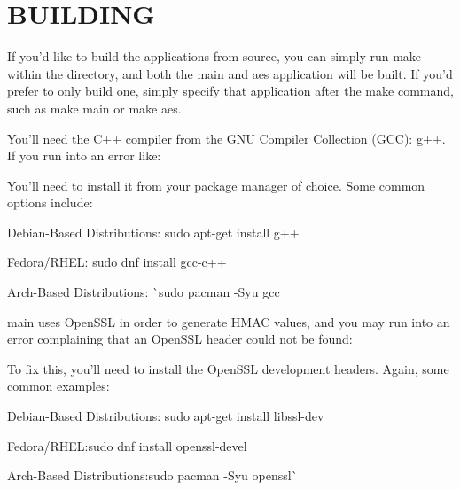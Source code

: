 \chapter{BUILDING}
\hypertarget{md_BUILDING}{}\label{md_BUILDING}
If you’d like to build the applications from source, you can simply run {\ttfamily make} within the directory, and both the {\ttfamily main} and {\ttfamily aes} application will be built. If you’d prefer to only build one, simply specify that application after the make command, such as {\ttfamily make main} or {\ttfamily make aes}.

You’ll need the C++ compiler from the GNU Compiler Collection (GCC)\+: {\ttfamily g++}. If you run into an error like\+: 
\begin{DoxyCode}{0}

\end{DoxyCode}


You’ll need to install it from your package manager of choice. Some common options include\+:
\begin{DoxyItemize}
\item Debian-\/\+Based Distributions\+: {\ttfamily sudo apt-\/get install g++}
\item Fedora/\+RHEL\+: {\ttfamily sudo dnf install gcc-\/c++}
\item Arch-\/\+Based Distributions\+: \`{}sudo pacman -\/Syu gcc
\end{DoxyItemize}

{\ttfamily main} uses Open\+SSL in order to generate HMAC values, and you may run into an error complaining that an Open\+SSL header could not be found\+:


\begin{DoxyCode}{0}

\end{DoxyCode}


To fix this, you’ll need to install the Open\+SSL development headers. Again, some common examples\+:
\begin{DoxyItemize}
\item Debian-\/\+Based Distributions\+: {\ttfamily sudo apt-\/get install libssl-\/dev}
\item {\ttfamily Fedora/\+RHEL\+:}sudo dnf install openssl-\/devel{\ttfamily }
\item {\ttfamily Arch-\/\+Based Distributions\+:}sudo pacman -\/Syu openssl\`{} 
\end{DoxyItemize}